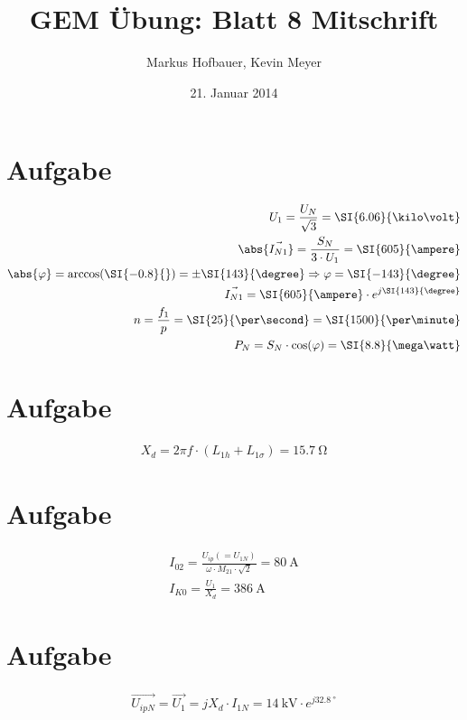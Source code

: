 \documentclass[10pt,a4paper]{article}
\begin{document}
\title{GEM Übung: \textbf{Blatt 8} Mitschrift}
\date{21. Januar 2014}
\author{Markus Hofbauer, Kevin Meyer}
\maketitle


\section{Aufgabe}
\begin{align*}
U_1 = \frac{U_N}{\sqrt{3}} = \SI{6.06}{\kilo\volt}\\
\abs{\vec{I_{N1}}}= \frac{S_N}{3 \cdot U_1} = \SI{605}{\ampere}\\
\abs{\varphi} = \arccos(\SI{-0.8}{}) = \pm \SI{143}{\degree} \Rightarrow \varphi = \SI{-143}{\degree}\\
\vec{I_{N1}} = \SI{605}{\ampere} \cdot e^{j\SI{143}{\degree}}\\
n = \frac{f_1}{p} = \SI{25}{\per\second} = \SI{1500}{\per\minute}\\
P_N = S_N \cdot \cos(\varphi) = \SI{8.8}{\mega\watt}
\end{align*}

\section{Aufgabe}
\begin{align*}
X_d = 2\pi f \cdot (L_{1h} + L_{1\sigma}) = \SI{15.7}{\ohm}
\end{align*}

\section{Aufgabe}
\begin{align*}
I_{02} = \frac{U_{ip}(=U_{1N})}{\omega \cdot M_{21} \cdot \sqrt{2}} = \SI{80}{\ampere}\\
I_{K0} = \frac{U_1}{X_d} = \SI{386}{\ampere}
\end{align*}

\section{Aufgabe}
\begin{align*}
\vec{U_{ipN}} = \vec{U_1} = j X_d \cdot I_{1N} = \SI{14}{\kilo\volt} \cdot e^{j\SI{32.8}{\degree}}
\end{align*}
\end{document}
